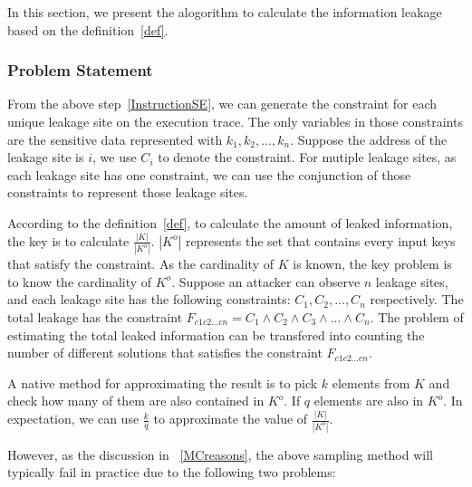 In this section, we present the alogorithm to calculate the information
leakage based on the definition~\ref{def}. 

\subsubsection{Problem Statement}
From the above step~\ref{InstructionSE}, we can generate the constraint 
for each unique leakage site on the execution trace.
The only variables in those constraints are the sensitive data represented
with $k_1, k_2, ... , k_n$. Suppose the address of the leakage site is $i$,
we use $C_i$ to denote the constraint. For mutiple leakage sites, 
as each leakage site has one constraint, we can 
use the conjunction of those constraints to represent those leakage sites. 

According to the definition~\ref{def}, to calculate the amount of leaked 
information, the key is to calculate $\frac{|K|}{|K^o|}$. $|K^o|$ represents
the set that contains every input keys that satisfy the constraint. As the 
cardinality of $K$ is known, the key problem is to know the cardinality of
$K^o$. Suppose an attacker can observe $n$ leakage sites, and each leakage site has
the following constraints: $C_1, C_2, ..., C_n$ respectively. 
The total leakage has the constraint $F_{c1c2...cn} = C_1 \land C_2 \land C_3
\land ... \land C_n$. The problem of estimating the total leaked information 
can be transfered into counting the number of different solutions that satisfies
the constraint $F_{c1c2...cn}$. 

A native method for approximating 
the result is to pick $k$ elements from $K$ and check how many of them are also
contained in $K^o$. If $q$ elements are also in $K^o$. In expectation, we can
use $\frac{k}{q}$ to approximate the value of $\frac{|K|}{|K^o|}$.

However, as the discussion in ~\ref{MCreasons},
the above sampling method will typically fail in practice due to the following two problems:

